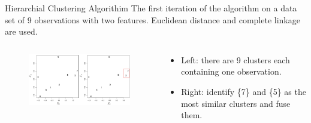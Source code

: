 \documentclass[
  ignorenonframetext,
  aspectratio=169,
]{beamer}
\begin{document}
\begin{frame}{Hierarchial Clustering Algorithim}
\protect\hypertarget{hierarchial-clustering-algorithim}{}
The first iteration of the algorithm on a data set of 9 observations
with two features. Euclidean distance and complete linkage are used.

\begin{columns}[T]
\begin{column}{0.7\textwidth}
\begin{figure}

{\centering \includegraphics[width=4.27083in,height=\textheight]{images/hierarchical_alg1.png}

}

\end{figure}
\end{column}

\begin{column}{0.3\textwidth}
\begin{itemize}
\item
  Left: there are 9 clusters each containing one observation.
\item
  Right: identify \{7\} and \{5\} as the most similar clusters and fuse
  them.
\end{itemize}
\end{column}
\end{columns}
\end{frame}
\end{document}
